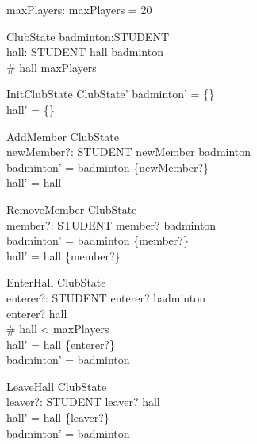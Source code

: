 \documentclass{article}
\begin{document}
\begin{zed}
[STUDENT]
\end{zed}

\begin{axdef}
maxPlayers: \nat
\where
maxPlayers = 20
\end{axdef}

\begin{schema}{ClubState}
badminton:\power STUDENT\\
hall: \power STUDENT
\where
hall \subseteq badminton\\
\# hall \leq maxPlayers
\end{schema}

\begin{schema}{InitClubState}
ClubState'
\where
badminton' = \{\}\\
hall' = \{\}
\end{schema}

\begin{schema}{AddMember}
\Delta ClubState \\
newMember?: STUDENT
\where
newMember \notin badminton \\
badminton' = badminton \cup \{newMember?\} \\
hall' = hall
\end{schema}

\begin{schema}{RemoveMember}
\Delta ClubState \\
member?: STUDENT
\where
member? \in badminton \\
badminton' = badminton \setminus \{member?\} \\
hall' = hall \setminus \{member?\}
\end{schema}

\begin{schema}{EnterHall}
\Delta ClubState \\
enterer?: STUDENT
\where
enterer? \in badminton \\
enterer? \notin hall\\
\# hall < maxPlayers \\
hall' = hall \cup \{enterer?\} \\
badminton' = badminton
\end{schema}

\begin{schema}{LeaveHall}
\Delta ClubState \\
leaver?: STUDENT
\where
leaver? \in hall \\
hall' = hall \setminus \{leaver?\} \\
badminton' = badminton
\end{schema}
\end{document}
